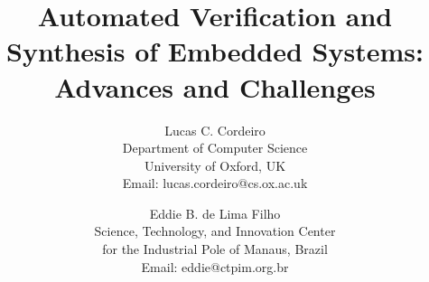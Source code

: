 \documentclass{acm_sen_article}
\begin{document}
%
\title{Automated Verification and Synthesis of Embedded Systems: Advances and Challenges}


\author{Lucas C. Cordeiro \\
Department of Computer Science\\
University of Oxford, UK\\
Email: lucas.cordeiro@cs.ox.ac.uk
\and
Eddie B. de Lima Filho \\
Science, Technology, and Innovation Center\\ for the Industrial Pole of Manaus, Brazil \\
Email: eddie@ctpim.org.br}


% 
\end{document}
